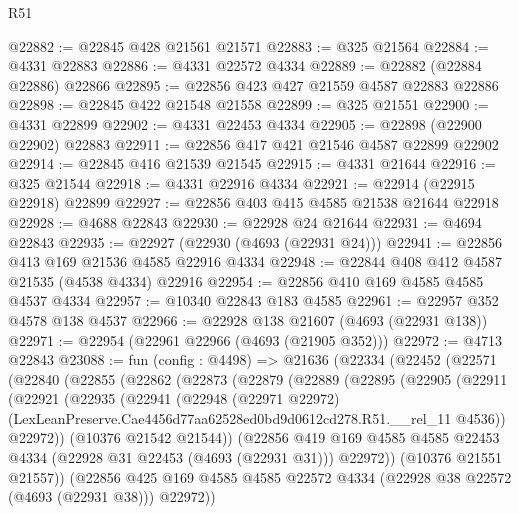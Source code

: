 \begin{lexlean}{R51}
\begin{coremodule}
@22882 := @22845 @428 @21561 @21571
@22883 := @325 @21564
@22884 := @4331 @22883
@22886 := @4331 @22572 @4334
@22889 := @22882 (@22884 @22886) @22866
@22895 := @22856 @423 @427 @21559 @4587 @22883 @22886
@22898 := @22845 @422 @21548 @21558
@22899 := @325 @21551
@22900 := @4331 @22899
@22902 := @4331 @22453 @4334
@22905 := @22898 (@22900 @22902) @22883
@22911 := @22856 @417 @421 @21546 @4587 @22899 @22902
@22914 := @22845 @416 @21539 @21545
@22915 := @4331 @21644
@22916 := @325 @21544
@22918 := @4331 @22916 @4334
@22921 := @22914 (@22915 @22918) @22899
@22927 := @22856 @403 @415 @4585 @21538 @21644 @22918
@22928 := @4688 @22843
@22930 := @22928 @24 @21644
@22931 := @4694 @22843
@22935 := @22927 (@22930 (@4693 (@22931 @24)))
@22941 := @22856 @413 @169 @21536 @4585 @22916 @4334
@22948 := @22844 @408 @412 @4587 @21535 (@4538 @4334) @22916
@22954 := @22856 @410 @169 @4585 @4585 @4537 @4334
@22957 := @10340 @22843 @183 @4585
@22961 := @22957 @352 @4578 @138 @4537
@22966 := @22928 @138 @21607 (@4693 (@22931 @138))
@22971 := @22954 (@22961 @22966 (@4693 (@21905 @352)))
@22972 := @4713 @22843
@23088 := fun (config : @4498) =>
  @21636
    (@22334
      (@22452
        (@22571
          (@22840
            (@22855
              (@22862
                (@22873
                  (@22879
                    (@22889
                      (@22895
                        (@22905
                          (@22911
                            (@22921
                              (@22935
                                (@22941
                                  (@22948
                                    (@22971 @22972)
                                    (LexLeanPreserve.Cae4456d77aa62528ed0bd9d0612cd278.R51.__rel_11
                                      @4536))
                                  @22972))
                              (@10376 @21542 @21544))
                            (@22856
                              @419
                              @169
                              @4585
                              @4585
                              @22453
                              @4334
                              (@22928 @31 @22453 (@4693 (@22931 @31)))
                              @22972))
                          (@10376 @21551 @21557))
                        (@22856
                          @425
                          @169
                          @4585
                          @4585
                          @22572
                          @4334
                          (@22928 @38 @22572 (@4693 (@22931 @38)))
                          @22972))

\end{coremodule}
\end{lexlean}
